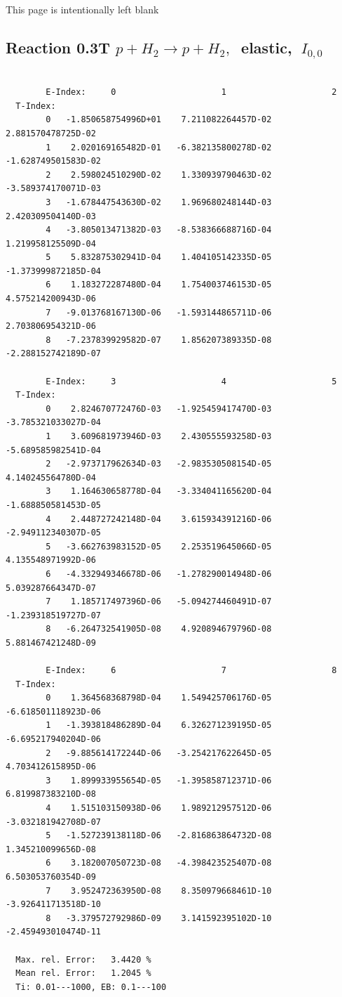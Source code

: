 \documentclass[12pt,dvips]{article}
\begin{document}
\newpage
This page is intentionally left blank
\newpage


\subsection{
Reaction 0.3T  $p + H_2 \rightarrow  p + H_2 ,\ $  elastic,
$\  I_{0,0}$
}

\begin{small}\begin{verbatim}

        E-Index:     0                     1                     2
  T-Index:
        0   -1.850658754996D+01    7.211082264457D-02    2.881570478725D-02
        1    2.020169165482D-01   -6.382135800278D-02   -1.628749501583D-02
        2    2.598024510290D-02    1.330939790463D-02   -3.589374170071D-03
        3   -1.678447543630D-02    1.969680248144D-03    2.420309504140D-03
        4   -3.805013471382D-03   -8.538366688716D-04    1.219958125509D-04
        5    5.832875302941D-04    1.404105142335D-05   -1.373999872185D-04
        6    1.183272287480D-04    1.754003746153D-05    4.575214200943D-06
        7   -9.013768167130D-06   -1.593144865711D-06    2.703806954321D-06
        8   -7.237839929582D-07    1.856207389335D-08   -2.288152742189D-07

        E-Index:     3                     4                     5
  T-Index:
        0    2.824670772476D-03   -1.925459417470D-03   -3.785321033027D-04
        1    3.609681973946D-03    2.430555593258D-03   -5.689585982541D-04
        2   -2.973717962634D-03   -2.983530508154D-05    4.140245564780D-04
        3    1.164630658778D-04   -3.334041165620D-04   -1.688850581453D-05
        4    2.448727242148D-04    3.615934391216D-06   -2.949112340307D-05
        5   -3.662763983152D-05    2.253519645066D-05    4.135548971992D-06
        6   -4.332949346678D-06   -1.278290014948D-06    5.039287664347D-07
        7    1.185717497396D-06   -5.094274460491D-07   -1.239318519727D-07
        8   -6.264732541905D-08    4.920894679796D-08    5.881467421248D-09

        E-Index:     6                     7                     8
  T-Index:
        0    1.364568368798D-04    1.549425706176D-05   -6.618501118923D-06
        1   -1.393818486289D-04    6.326271239195D-05   -6.695217940204D-06
        2   -9.885614172244D-06   -3.254217622645D-05    4.703412615895D-06
        3    1.899933955654D-05   -1.395858712371D-06    6.819987383210D-08
        4    1.515103150938D-06    1.989212957512D-06   -3.032181942708D-07
        5   -1.527239138118D-06   -2.816863864732D-08    1.345210099656D-08
        6    3.182007050723D-08   -4.398423525407D-08    6.503053760354D-09
        7    3.952472363950D-08    8.350979668461D-10   -3.926411713518D-10
        8   -3.379572792986D-09    3.141592395102D-10   -2.459493010474D-11

  Max. rel. Error:   3.4420 %
  Mean rel. Error:   1.2045 %
  Ti: 0.01---1000, EB: 0.1---100
\end{verbatim}\end{small}
\end{document}
